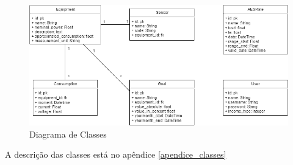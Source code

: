 \begin{figure}[H]
\begin{center}
\includegraphics[width=1\textwidth]{figuras/diagrama_classes.png}
\caption{\label{fig:diagrama-classes} Diagrama de Classes}
\end{center}
\end{figure}

A descrição das classes está no apêndice \ref{apendice_classes}